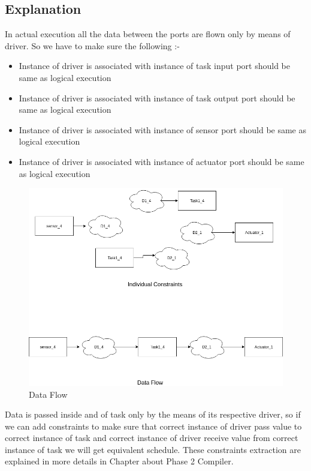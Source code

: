 \documentclass[16pt]{report}
\begin{document}
\subsection{Explanation}
In actual execution all the data between the ports are flown only by means of driver. So we have to make sure the following :-
\begin{itemize}
    \item Instance of driver is associated with instance of task input port should be same as logical execution
    \item Instance of driver is associated with instance of task output port should be same as logical execution
    \item Instance of driver is associated with instance of sensor port should be same as logical execution
    \item Instance of driver is associated with instance of actuator port should be same as logical execution
\end{itemize}
\begin{figure}[H]
\centering
\includegraphics[width=\linewidth]{21DataFlow.png}
\caption{Data Flow}
\end{figure}
Data is passed inside and of task only by the means of its respective driver, so if we can add constraints to make sure that correct instance of driver pass value to correct instance of task and correct instance of driver receive value from correct instance of task we will get equivalent schedule. These constraints extraction are explained in more details in Chapter about Phase 2 Compiler.
\end{document}
